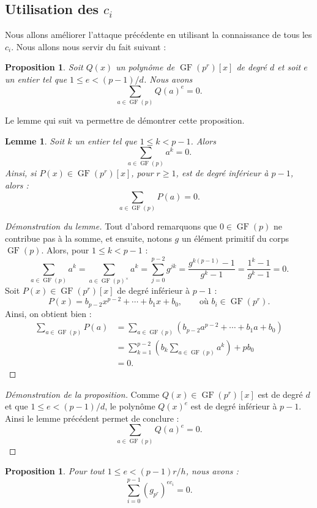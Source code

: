 \documentclass[a4paper, titlepage]{article}
\newtheorem{lemm}[theo]{Lemme}
\newtheorem{prop}[theo]{Proposition}
\theoremstyle{definition}
\theoremstyle{remark}
\def\gf{\operatorname{GF}}
\begin{document}
\subsection{Utilisation des $c_i$}

Nous allons améliorer l'attaque précédente en utilisant la connaissance de tous les $c_i$. Nous allons nous servir du fait suivant :

\begin{prop}
Soit $Q(x)$ un polynôme de $\gf(p^r)[x]$ de degré $d$ et soit $e$ un entier tel que $1 \leqslant e < (p-1)/d$. Nous avons $$\sum_{a \in \gf(p)} Q(a)^e = 0.$$
\end{prop}

Le lemme qui suit va permettre de démontrer cette proposition.

\begin{lemm}
Soit $k$ un entier tel que $1 \leqslant k < p-1$. Alors
$$\sum_{a\in\gf(p)} a^k = 0.$$
Ainsi, si $P(x) \in \gf(p^r)[x]$, pour $r \geqslant 1$, est de degré inférieur à $p-1$, alors : $$\sum_{a\in\gf(p)} P(a) = 0.$$
\end{lemm}

\begin{proof}[Démonstration du lemme]
Tout d'abord remarquons que $0 \in \gf(p)$ ne contribue pas à la somme, et ensuite, notons $g$ un élément primitif du corps $\gf(p)$. Alors, pour $1 \leqslant k < p-1$ :
$$\sum_{a\in\gf(p)} a^k = \sum_{a\in\gf(p)^\times} a^k = \sum_{j=0}^{p-2} g^{jk} = \frac{g^{k(p-1)} - 1}{g^{k} - 1} = \frac{1^{k} - 1}{g^{k} - 1} = 0.$$
Soit $P(x) \in \gf(p^r)[x]$ de degré inférieur à $p-1$ :
$$P(x) = b_{p-2}x^{p-2} + \cdots + b_1x + b_0, \qquad \text{où }b_i \in \gf(p^r).$$
Ainsi, on obtient bien :
\begin{align*}
\sum_{a\in\gf(p)} P(a) &= \sum_{a\in\gf(p)} \left({b_{p-2}a^{p-2} + \cdots + b_1a + b_0}\right) \\
&= \sum_{k=1}^{p-2} \left({ b_k\sum_{a\in\gf(p)} a^k}\right) + pb_0 \\
&= 0.
\end{align*}
\end{proof}

\begin{proof}[Démonstration de la proposition]
Comme $Q(x) \in \gf(p^r)[x]$ est de degré $d$ et que $1\leqslant e < (p-1)/d$, le polynôme $Q(x)^e$ est de degré inférieur à $p-1$. Ainsi le lemme précédent permet de conclure :
$$\sum_{a\in\gf(p)} Q(a)^e = 0.$$
\end{proof}

\begin{prop}
Pour tout $1 \leqslant e < (p-1)r/h$, nous avons :
$$\sum_{i=0}^{p-1} (g_{p^r})^{ec_i} = 0.$$
\end{prop}
\end{document}
